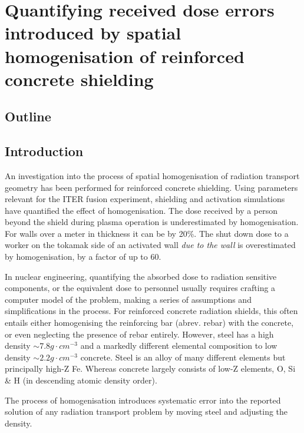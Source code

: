 
\chapter{Quantifying received dose errors introduced by spatial homogenisation of reinforced concrete shielding}

\ifpdf
    \graphicspath{{Chapter2/Figs/Raster/}{Chapter2/Figs/PDF/}{Chapter2/Figs/}}
\else
    \graphicspath{{Chapter2/Figs/Vector/}{Chapter2/Figs/}}
\fi


\section{Outline}

\section{Introduction}
An investigation into the process of spatial homogenisation of radiation transport geometry has been performed for reinforced concrete shielding. Using parameters relevant for the ITER fusion experiment, shielding and activation simulations have quantified the effect of homogenisation. The dose received by a person beyond the shield during plasma operation is underestimated by homogenisation. For walls over a meter in thickness it can be by 20\%. The shut down dose to a worker on the tokamak side of an activated wall \textit{due to the wall} is overestimated by homogenisation, by a factor of up to 60.

In nuclear engineering, quantifying the absorbed dose to radiation sensitive components, or the equivalent dose to personnel usually requires crafting a computer model of the problem, making a series of assumptions and simplifications in the process. For reinforced concrete radiation shields, this often entails either homogenising the reinforcing bar (abrev. rebar) with the concrete, or even neglecting the presence of rebar entirely. However, steel has a high density $\sim7.8g\cdot cm^{-3}$ and a markedly different elemental composition to low density $\sim2.2g\cdot cm^{-3}$ concrete. Steel is an alloy of many different elements but principally high-Z Fe. Whereas concrete largely consists of low-Z elements, O, Si \& H (in descending atomic density order).\par
The process of homogenisation introduces systematic error into the reported solution of any radiation transport problem by moving steel and adjusting the density.

